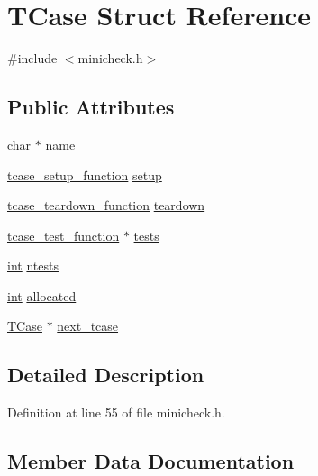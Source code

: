 \hypertarget{struct_t_case}{}\section{T\+Case Struct Reference}
\label{struct_t_case}


{\ttfamily \#include $<$minicheck.\+h$>$}

\subsection*{Public Attributes}
\begin{DoxyCompactItemize}
\item 
char $\ast$ \hyperlink{struct_t_case_a112c9a3b3e73275738a789d5f6758c8e}{name}
\item 
\hyperlink{minicheck_8h_af6dd219406a27a8d84abbc86206bc324}{tcase\+\_\+setup\+\_\+function} \hyperlink{struct_t_case_aa9b64bff7661f76f093240b74ad1dbe8}{setup}
\item 
\hyperlink{minicheck_8h_ad27f883682f83ad17500cf2c3b97453d}{tcase\+\_\+teardown\+\_\+function} \hyperlink{struct_t_case_ad4f1e0d9f95b5a4ea4edee3f5952da3e}{teardown}
\item 
\hyperlink{minicheck_8h_a384507a3dd67f42525c072669f5ef124}{tcase\+\_\+test\+\_\+function} $\ast$ \hyperlink{struct_t_case_a002f38ddf6c5d8f3b6fe72cc1cc2384f}{tests}
\item 
\hyperlink{xmltok_8h_a5a0d4a5641ce434f1d23533f2b2e6653}{int} \hyperlink{struct_t_case_a9077ace853866e23d4c0d3ef01832994}{ntests}
\item 
\hyperlink{xmltok_8h_a5a0d4a5641ce434f1d23533f2b2e6653}{int} \hyperlink{struct_t_case_a92481912b4d610eac7f45f563bf9e4d9}{allocated}
\item 
\hyperlink{struct_t_case}{T\+Case} $\ast$ \hyperlink{struct_t_case_a8d56f03bc84c7dab23e390902e7992e8}{next\+\_\+tcase}
\end{DoxyCompactItemize}


\subsection{Detailed Description}


Definition at line 55 of file minicheck.\+h.



\subsection{Member Data Documentation}
